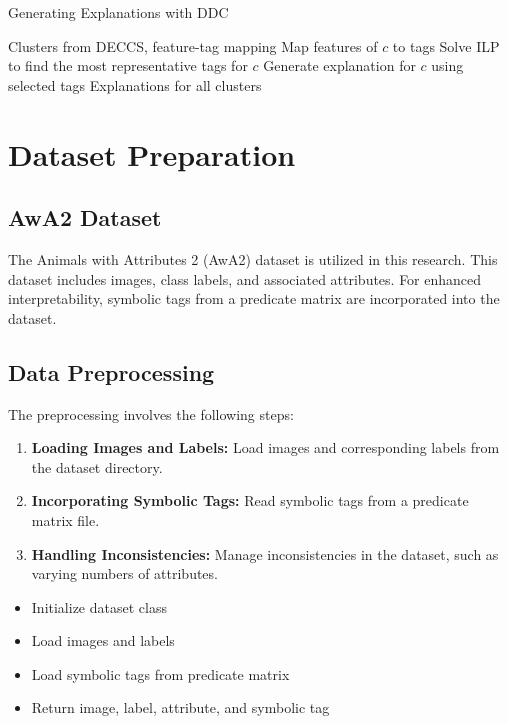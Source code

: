 \begin{algorithm}[H]
\caption{Generating Explanations with DDC}
\begin{algorithmic}[1]
\REQUIRE Clusters from DECCS, feature-tag mapping
   \STATE Map features of $c$ to tags
   \STATE Solve ILP to find the most representative tags for $c$
   \STATE Generate explanation for $c$ using selected tags
\ENDFOR
\ENSURE Explanations for all clusters
\end{algorithmic}
\end{algorithm}

\section{Dataset Preparation}
\subsection{AwA2 Dataset}
The Animals with Attributes 2 (AwA2) dataset is utilized in this research. This dataset includes images, class labels, and associated attributes. For enhanced interpretability, symbolic tags from a predicate matrix are incorporated into the dataset.

\subsection{Data Preprocessing}
The preprocessing involves the following steps:
\begin{enumerate}
    \item \textbf{Loading Images and Labels:} Load images and corresponding labels from the dataset directory.
    \item \textbf{Incorporating Symbolic Tags:} Read symbolic tags from a predicate matrix file.
    \item \textbf{Handling Inconsistencies:} Manage inconsistencies in the dataset, such as varying numbers of attributes.
\end{enumerate}

\begin{schema}
    \begin{itemize}
        \item Initialize dataset class
        \item Load images and labels
        \item Load symbolic tags from predicate matrix
        \item Return image, label, attribute, and symbolic tag
    \end{itemize}
\end{schema}


